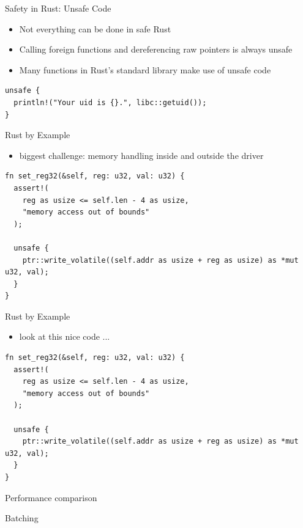\documentclass[NET,english,aspectratio=169,notitleframe]{tumbeamer}
\begin{document}
\begin{frame}[fragile]{Safety in Rust: Unsafe Code}
\begin{itemize}
\item Not everything can be done in safe Rust
\item Calling foreign functions and dereferencing raw pointers is always unsafe
\item Many functions in Rust's standard library make use of unsafe code
\end{itemize}
\begin{verbatim}
unsafe {
  println!("Your uid is {}.", libc::getuid());
}
\end{verbatim}
\end{frame}

\begin{frame}[fragile]{Rust by Example}
\begin{itemize}
\item biggest challenge: memory handling inside and outside the driver
\end{itemize}
\begin{verbatim}
fn set_reg32(&self, reg: u32, val: u32) {
  assert!(
    reg as usize <= self.len - 4 as usize,
    "memory access out of bounds"
  );

  unsafe {
    ptr::write_volatile((self.addr as usize + reg as usize) as *mut u32, val);
  }
}
\end{verbatim}
\end{frame}

\begin{frame}[fragile]{Rust by Example}
\begin{itemize}
\item look at this nice code ...
\end{itemize}
\begin{verbatim}
fn set_reg32(&self, reg: u32, val: u32) {
  assert!(
    reg as usize <= self.len - 4 as usize,
    "memory access out of bounds"
  );

  unsafe {
    ptr::write_volatile((self.addr as usize + reg as usize) as *mut u32, val);
  }
}
\end{verbatim}
\end{frame}

\begin{frame}{Performance comparison}
\centering
\end{frame}

\begin{frame}{Batching}
\centering
\end{frame}
\end{document}
